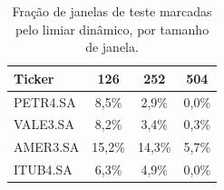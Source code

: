\begin{table}[h]
\centering
\caption{Fração de janelas de teste marcadas pelo limiar dinâmico, por tamanho de janela.}
\label{tab:sensibilidade}
\begin{tabular}{lccc}
\toprule
\textbf{Ticker} & \textbf{126} & \textbf{252} & \textbf{504} \\
\midrule
PETR4.SA & 8{,}5\%  & 2{,}9\%  & 0{,}0\% \\
VALE3.SA & 8{,}2\%  & 3{,}4\%  & 0{,}3\% \\
AMER3.SA & 15{,}2\% & 14{,}3\% & 5{,}7\% \\
ITUB4.SA & 6{,}3\%  & 4{,}9\%  & 0{,}0\% \\
\bottomrule
\end{tabular}
\end{table}
